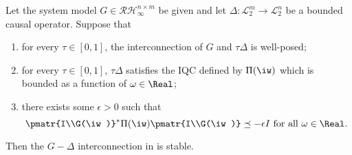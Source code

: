 \begin{thm} Let the system model $G\in\mathcal{RH}^{n\times m}_\infty$ be given and let $\Delta:\mathcal{L}^m_2\to\mathcal{L}^n_2$ be a bounded causal operator. Suppose that
\begin{enumerate}
	\item for every $\tau\in[0,1]$, the interconnection of $G$ and $\tau\Delta$ is well-posed;
	\item for every $\tau\in[0,1]$, $\tau\Delta$ satisfies the IQC defined by $\Pi(\iw)$ {which is bounded as a function of $\omega\in\Real$;}
	\item there exists some $\epsilon>0$ such that
	\begin{equation}
	\pmatr{I\\G(\iw)}^*\Pi(\iw)\pmatr{I\\G(\iw)} \preceq -\epsilon I\text{\ for all\ }\omega\in\mathbb{\Real}.
	\label{eq:IQCthmFDI}
	\end{equation}
\label{IQCthm}
\end{enumerate}
Then the $G-\Delta$ interconnection {in }  is stable.
\end{thm}
